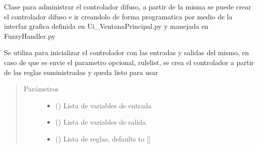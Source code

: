 \documentclass[letterpaper,10pt,spanish]{sphinxmanual}
\begin{document}
\begin{fulllineitems}
\label{\detokenize{codigos/rutinas_fuzzy:rutinas_fuzzy.FuzzyController}}
Clase para administrar el controlador difuso, a partir de la misma se puede crear el controlador difuso e ir creandolo de forma programatica por medio de la interfaz grafica definida en Ui\_VentanaPrincipal.py y manejada en FuzzyHandler.py

\begin{fulllineitems}
\label{\detokenize{codigos/rutinas_fuzzy:rutinas_fuzzy.FuzzyController.__init__}}
Se utiliza para inicializar el controlador con las entradas y salidas del mismo, en caso de que se envie el parametro opcional, rulelist, se crea el controlador a partir de las reglas suministradas y queda listo para usar
\begin{quote}\begin{description}
\item[{Parámetros}] \leavevmode\begin{itemize}
\item {} 
 () \textendash{} Lista de variables de entrada

\item {} 
 () \textendash{} Lista de variables de salida

\item {} 
 (\sphinxstyleliteralemphasis{\sphinxupquote{, }}) \textendash{} Lista de reglas, defaults to {[}{]}

\end{itemize}

\end{description}\end{quote}


\end{fulllineitems}
\end{fulllineitems}
\end{document}
